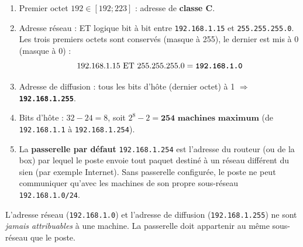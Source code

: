 \documentclass[11pt]{article}
\begin{document}
\begin{corrige}

\begin{enumerate}
    \item Premier octet $192 \in [192 ; 223]$ : adresse de \textbf{classe C}.
    \item Adresse réseau : ET logique bit à bit entre \texttt{192.168.1.15} et \texttt{255.255.255.0}. Les trois premiers octets sont conservés (masque à 255), le dernier est mis à 0 (masque à 0) :
    \[ 192.168.1.15 \ \text{ET}\ 255.255.255.0 = \textbf{\texttt{192.168.1.0}} \]
    \item Adresse de diffusion : tous les bits d'hôte (dernier octet) à 1 $\Rightarrow$ \textbf{\texttt{192.168.1.255}}.
    \item Bits d'hôte : $32 - 24 = 8$, soit $2^8 - 2 = \textbf{254 machines maximum}$ (de \texttt{192.168.1.1} à \texttt{192.168.1.254}).
    \item La \textbf{passerelle par défaut} \texttt{192.168.1.254} est l'adresse du routeur (ou de la box) par lequel le poste envoie tout paquet destiné à un réseau différent du sien (par exemple Internet). Sans passerelle configurée, le poste ne peut communiquer qu'avec les machines de son propre sous-réseau \texttt{192.168.1.0/24}.
\end{enumerate}

\begin{attention}
L'adresse réseau (\texttt{192.168.1.0}) et l'adresse de diffusion (\texttt{192.168.1.255}) ne sont \emph{jamais attribuables} à une machine. La passerelle doit appartenir au même sous-réseau que le poste.
\end{attention}
\end{corrige}
\end{document}
